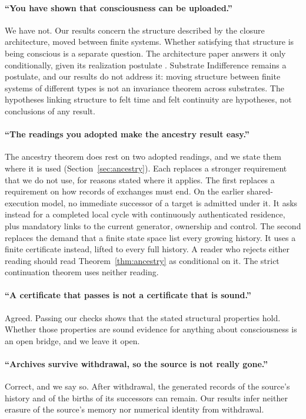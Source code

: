 \paragraph{``You have shown that consciousness can be uploaded.''}
We have not. Our results concern the structure described by the closure
architecture, moved between finite systems. Whether satisfying that structure
is being conscious is a separate question. The architecture paper answers it
only conditionally, given its realization postulate \citep{TsiokosArchitecture2026}.
Substrate Indifference remains a postulate, and our results do not address it:
moving structure between finite systems of different types is not an
invariance theorem across substrates. The hypotheses linking structure to felt
time and felt continuity are hypotheses, not conclusions of any result.

\paragraph{``The readings you adopted make the ancestry result easy.''}
The ancestry theorem does rest on two adopted readings, and we state them
where it is used (Section~\ref{sec:ancestry}). Each replaces a stronger
requirement that we do not use, for reasons stated where it applies. The first replaces a
requirement on how records of exchanges must end. On the earlier
shared-execution model, no immediate successor of a target is admitted under
it. It asks instead for a completed local
cycle with continuously authenticated residence, plus mandatory links to the
current generator, ownership and control. The second replaces the demand that
a finite state space list every growing history. It uses a finite certificate
instead, lifted to every full history. A reader who rejects either reading
should read Theorem~\ref{thm:ancestry} as conditional on it. The strict
continuation theorem uses neither reading.

\paragraph{``A certificate that passes is not a certificate that is sound.''}
Agreed. Passing our checks shows that the stated structural properties hold.
Whether those properties are sound evidence for anything about consciousness
is an open bridge, and we leave it open.

\paragraph{``Archives survive withdrawal, so the source is not really gone.''}
Correct, and we say so. After withdrawal, the generated records of the
source's history and of the births of its successors can remain. Our results
infer neither erasure of the source's memory nor numerical identity from
withdrawal.

